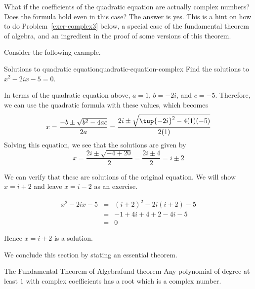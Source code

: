 What if the coefficients of the quadratic equation are actually complex
numbers? Does the formula hold even in this case? The answer is yes. This is
a hint on how to do Problem~\ref{exer-complex3} below, a special case of the
fundamental theorem of algebra, and an ingredient in the proof of some
versions of this theorem. 

Consider the following example. 

\begin{example}{Solutions to quadratic equation}{quadratic-equation-complex}
Find the solutions to $x^{2}-2ix-5=0$.
\end{example}

\begin{solution}
In terms of the quadratic equation above, $a=1$, $b=-2i$, and $c=-5$.
Therefore, we can use the quadratic formula with these values, which becomes
\begin{equation*}
x=
\frac{-b\pm \sqrt{b^{2}-4ac}}{2a}
= 
\frac{2i \pm \sqrt{\tup{-2i}^{2} - 4 (1)(-5)}}{2(1)}
\end{equation*}
Solving this equation, we see that the solutions are given by
\begin{equation*}
x=\frac{2i\pm \sqrt{-4+20}}{2}=\frac{2i\pm 4}{2}=i\pm 2
\end{equation*}

We can verify that these are solutions of the original equation. 
We will show $x = i + 2$ and leave $x = i-2$ as an exercise.

\begin{eqnarray*}
x^{2}-2ix-5
&=& (i+2)^2 - 2i (i+2) - 5 \\
&=& -1 + 4i + 4 + 2 - 4i - 5 \\
&=& 0
\end{eqnarray*}

Hence $x = i+2$ is a solution. 
\end{solution}

We conclude this section by stating an essential theorem.

\begin{theorem}{The Fundamental Theorem of Algebra}{fund-theorem}
Any polynomial of degree at least $1$ with complex coefficients has a root which is a complex number.
\end{theorem}
